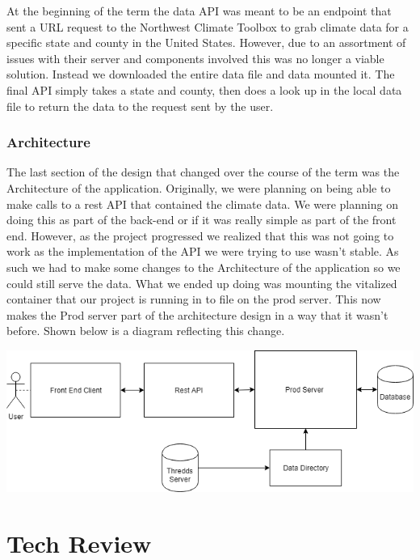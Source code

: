 \documentclass[onecolumn, draftclsnofoot,10pt, compsoc]{article}
\begin{document}
        At the beginning of the term the data API was meant to be an endpoint that sent a URL request to the Northwest Climate Toolbox to grab climate data for a specific state and county in the United States. However, due to an assortment of issues with their server and components involved this was no longer a viable solution. Instead we downloaded the entire data file and data mounted it. The final API simply takes a state and county, then does a look up in the local data file to return the data to the request sent by the user.

        \subsubsection{Architecture}
        The last section of the design that changed over the course of the term was the Architecture of the application. Originally, we were planning on being able to make calls to a rest API that contained the climate data. We were planning on doing this as part of the back-end or if it was really simple as part of the front end. However, as the project progressed we realized that this was not going to work as the implementation of the API we were trying to use wasn't stable. As such we had to make some changes to the Architecture of the application so we could still serve the data. What we ended up doing was mounting the vitalized container that our project is running in to file on the prod server. This now makes the Prod server part of the architecture design in a way that it wasn't before. Shown below is a diagram reflecting this change.\\
        
        \begin{center}
        \includegraphics[width=15cm]{./Images/Architecture.png}
        \end{center}
        
        

\section{Tech Review}
	
\end{document}
